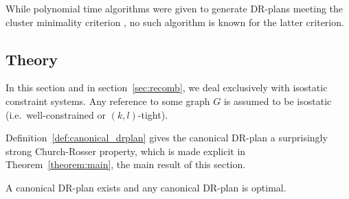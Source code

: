 \begin{enumerate}
    \indent
    While polynomial time algorithms were given to generate DR-plans meeting the cluster minimality criterion \cite{hoffman2001decompositionI}, no such algorithm is known for the latter criterion.
\end{enumerate}

\subsection{Theory}
In this section and in section~\ref{sec:recomb}, we deal exclusively with isostatic constraint systems. Any reference to some graph $G$ is assumed to be isostatic (i.e.\ well-constrained or $(k,l)$-tight).




Definition~\ref{def:canonical_drplan} gives the canonical DR-plan a surprisingly strong Church-Rosser property, which is made explicit in Theorem~\ref{theorem:main}, the main result of this section.

\begin{theorem}
\label{theorem:canonical_exists_and_is_optimal}
\label{theorem:canonical_is_optimal}
\label{theorem:main}
    A canonical DR-plan exists and any canonical DR-plan is optimal.
\end{theorem}






